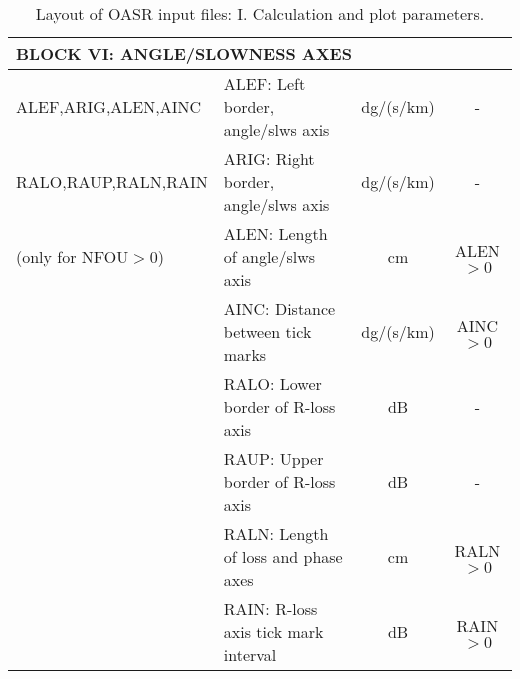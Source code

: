 \begin{table}
\begin{tabular}{|l|l|c|c|}
\hline
\multicolumn{4}{|l|}{\bf BLOCK VI: ANGLE/SLOWNESS AXES } \\
\hline
ALEF,ARIG,ALEN,AINC & ALEF: Left border, angle/slws axis & dg/(s/km) & - \\
RALO,RAUP,RALN,RAIN & ARIG: Right border, angle/slws axis & dg/(s/km) & - \\
(only for NFOU$>0$) & ALEN: Length of angle/slws axis & cm & ALEN$>0$ \\
	& AINC: Distance between tick marks & dg/(s/km) & AINC$>0$ \\
	& RALO: Lower border of R-loss axis & dB & - \\
	& RAUP: Upper border of R-loss axis & dB & - \\
	& RALN: Length of loss and phase axes & cm & RALN$>0$ \\
	& RAIN: R-loss axis tick mark interval & dB & RAIN$>0$ \\
\hline
\end{tabular}
\caption{Layout of OASR input files: I. Calculation and plot parameters.
	\label{tab:oasrI} }
\end{table} 

